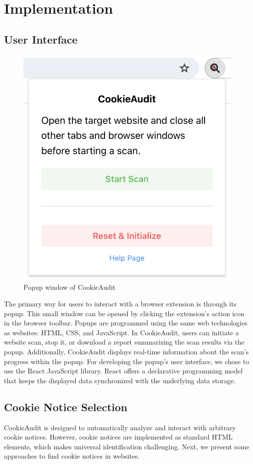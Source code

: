 \chapter{Implementation}

\section{User Interface}
\begin{figure}
	\centering
	\includegraphics[width=0.5\linewidth]{screenshot_popup.png}
	\caption{Popup window of CookieAudit}
	\label{fig:screenshot-popup}
\end{figure}
The primary way for users to interact with a browser extension is through its popup.
This small window can be opened by clicking the extension's action icon in the browser toolbar.
Popups are programmed using the same web technologies as websites: HTML, CSS, and JavaScript.
In CookieAudit, users can initiate a website scan, stop it, or download a report summarizing the scan results via the popup.
Additionally, CookieAudit displays real-time information about the scan's progress within the popup.
For developing the popup's user interface, we chose to use the React JavaScript library.
React offers a declarative programming model that keeps the displayed data synchronized with the underlying data storage.

\section{Cookie Notice Selection}
CookieAudit is designed to automatically analyze and interact with arbitrary cookie notices. 
However, cookie notices are implemented as standard HTML elements, which makes universal identification challenging.
Next, we present some approaches to find cookie notices in websites.

